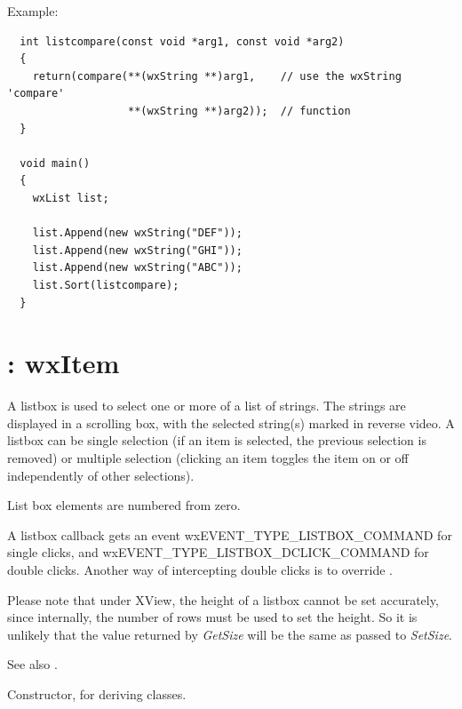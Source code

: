 Example:

\begin{verbatim}
  int listcompare(const void *arg1, const void *arg2)
  {
    return(compare(**(wxString **)arg1,    // use the wxString 'compare'
                   **(wxString **)arg2));  // function 
  }

  void main()
  {
    wxList list;

    list.Append(new wxString("DEF"));
    list.Append(new wxString("GHI"));
    list.Append(new wxString("ABC"));
    list.Sort(listcompare);
  }
\end{verbatim}

\section{: wxItem}\label{wxlistbox}

A listbox is used to select one or more of a list of strings. The
strings are displayed in a scrolling box, with the selected string(s)
marked in reverse video. A listbox can be single selection (if an item
is selected, the previous selection is removed) or multiple selection
(clicking an item toggles the item on or off independently of other
selections).

List box elements are numbered from zero.

A listbox callback gets an event wxEVENT\_TYPE\_LISTBOX\_COMMAND for single clicks, and
wxEVENT\_TYPE\_LISTBOX\_DCLICK\_COMMAND for double clicks. Another way of intercepting
double clicks is to override .

Please note that under XView, the height of a listbox cannot be set
accurately, since internally, the number of rows must be used to set
the height. So it is unlikely that the value returned by {\it GetSize} will
be the same as passed to {\it SetSize}.

See also .

\label{constrlistbox}


Constructor, for deriving classes.


